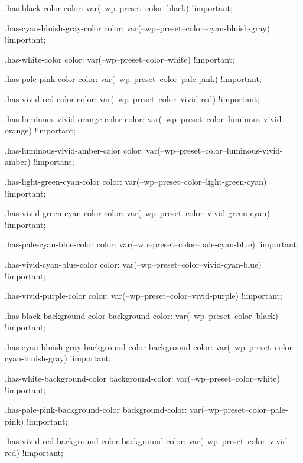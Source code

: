         .has-black-color {
            color: var(--wp--preset--color--black) !important;
        }

        .has-cyan-bluish-gray-color {
            color: var(--wp--preset--color--cyan-bluish-gray) !important;
        }

        .has-white-color {
            color: var(--wp--preset--color--white) !important;
        }

        .has-pale-pink-color {
            color: var(--wp--preset--color--pale-pink) !important;
        }

        .has-vivid-red-color {
            color: var(--wp--preset--color--vivid-red) !important;
        }

        .has-luminous-vivid-orange-color {
            color: var(--wp--preset--color--luminous-vivid-orange) !important;
        }

        .has-luminous-vivid-amber-color {
            color: var(--wp--preset--color--luminous-vivid-amber) !important;
        }

        .has-light-green-cyan-color {
            color: var(--wp--preset--color--light-green-cyan) !important;
        }

        .has-vivid-green-cyan-color {
            color: var(--wp--preset--color--vivid-green-cyan) !important;
        }

        .has-pale-cyan-blue-color {
            color: var(--wp--preset--color--pale-cyan-blue) !important;
        }

        .has-vivid-cyan-blue-color {
            color: var(--wp--preset--color--vivid-cyan-blue) !important;
        }

        .has-vivid-purple-color {
            color: var(--wp--preset--color--vivid-purple) !important;
        }

        .has-black-background-color {
            background-color: var(--wp--preset--color--black) !important;
        }

        .has-cyan-bluish-gray-background-color {
            background-color: var(--wp--preset--color--cyan-bluish-gray) !important;
        }

        .has-white-background-color {
            background-color: var(--wp--preset--color--white) !important;
        }

        .has-pale-pink-background-color {
            background-color: var(--wp--preset--color--pale-pink) !important;
        }

        .has-vivid-red-background-color {
            background-color: var(--wp--preset--color--vivid-red) !important;
        }

